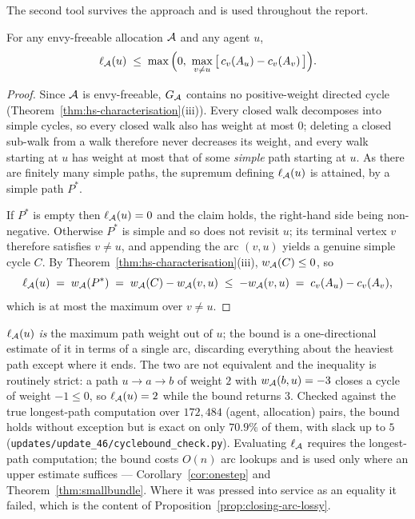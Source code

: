 The second tool survives the approach and is used throughout the report.

\begin{theorem}
\label{thm:cyclebound}
For any envy-freeable allocation $\mathcal{A}$ and any agent $u$,
\[
  \pathw{\alloc}(u) \;\le\; \max\Big(0, \ \max_{v \ne u}
  \big[\,\cost_v(\bundle{u}) - \cost_v(\bundle{v})\,\big]\Big).
\]
\end{theorem}

\begin{proof}
Since $\mathcal{A}$ is envy-freeable, $G_{\mathcal{A}}$ contains no
positive-weight directed cycle
(Theorem~\ref{thm:hs-characterisation}(iii)). Every closed walk decomposes into
simple cycles, so every closed walk also has weight at most $0$; deleting a
closed sub-walk from a walk therefore never decreases its weight, and every walk
starting at $u$ has weight at most that of some \emph{simple} path starting at
$u$. As there are finitely many simple paths, the supremum defining
$\ell_{\mathcal{A}}(u)$ is attained, by a simple path $P^{\ast}$.

If $P^{\ast}$ is empty then $\ell_{\mathcal{A}}(u) = 0$ and the claim holds, the
right-hand side being non-negative. Otherwise $P^{\ast}$ is simple and so does
not revisit $u$; its terminal vertex $v$ therefore satisfies $v \ne u$, and
appending the arc $(v,u)$ yields a genuine simple cycle $C$. By
Theorem~\ref{thm:hs-characterisation}(iii), $w_{\mathcal{A}}(C) \le 0$, so
\[
  \ell_{\mathcal{A}}(u) \;=\; w_{\mathcal{A}}(P^{\ast})
  \;=\; w_{\mathcal{A}}(C) - w_{\mathcal{A}}(v,u)
  \;\le\; -w_{\mathcal{A}}(v,u)
  \;=\; c_v(A_{u}) - c_v(A_{v}),
\]
which is at most the maximum over $v \ne u$.
\end{proof}

\begin{remark}
\label{rem:cyclebound-lossy}
$\ell_{\mathcal{A}}(u)$ \emph{is} the maximum path weight out of $u$; the bound is a
one-directional estimate of it in terms of a single arc, discarding everything
about the heaviest path except where it ends. The two are not equivalent and the
inequality is routinely strict: a path $u \to a \to b$ of weight $2$ with
$w_{\mathcal{A}}(b,u) = -3$ closes a cycle of weight $-1 \le 0$, so
$\ell_{\mathcal{A}}(u) = 2$ while the bound returns $3$. Checked against the true
longest-path computation over $172{,}484$ (agent, allocation) pairs, the bound
holds without exception but is exact on only $70.9\%$ of them, with slack up to
$5$ (\texttt{updates/update\_46/cyclebound\_check.py}). Evaluating $\ell_{\mathcal{A}}$
requires the longest-path computation; the bound costs $O(n)$ arc lookups and is
used only where an upper estimate suffices ---
Corollary~\ref{cor:onestep} and Theorem~\ref{thm:smallbundle}. Where it was
pressed into service as an equality it failed, which is the content of
Proposition~\ref{prop:closing-arc-lossy}.
\end{remark}

